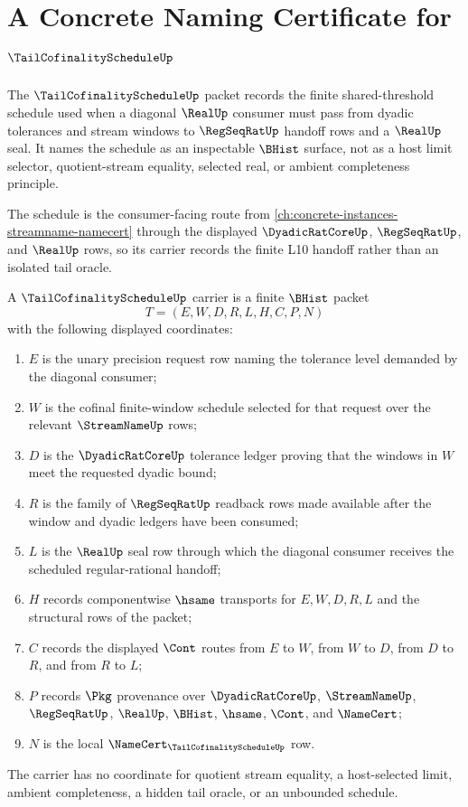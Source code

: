 \chapter{A Concrete Naming Certificate for $\TailCofinalityScheduleUp$}
\label{ch:concrete-instances-tail-cofinality-schedule-namecert}

The $\TailCofinalityScheduleUp$ packet records the finite shared-threshold schedule used when a diagonal $\RealUp$ consumer must pass from dyadic tolerances and stream windows to $\RegSeqRatUp$ handoff rows and a $\RealUp$ seal. It names the schedule as an inspectable $\BHist$ surface, not as a host limit selector, quotient-stream equality, selected real, or ambient completeness principle.

The schedule is the consumer-facing route from \autoref{ch:concrete-instances-streamname-namecert} through the displayed $\DyadicRatCoreUp$, $\RegSeqRatUp$, and $\RealUp$ rows, so its carrier records the finite L10 handoff rather than an isolated tail oracle.

\begin{definition}
\label{def:tail-cofinality-schedule-carrier}
A $\TailCofinalityScheduleUp$ carrier is a finite $\BHist$ packet
$$
T=(E,W,D,R,L,H,C,P,N)
$$
with the following displayed coordinates:
\begin{enumerate}
\item $E$ is the unary precision request row naming the tolerance level demanded by the diagonal consumer;
\item $W$ is the cofinal finite-window schedule selected for that request over the relevant $\StreamNameUp$ rows;
\item $D$ is the $\DyadicRatCoreUp$ tolerance ledger proving that the windows in $W$ meet the requested dyadic bound;
\item $R$ is the family of $\RegSeqRatUp$ readback rows made available after the window and dyadic ledgers have been consumed;
\item $L$ is the $\RealUp$ seal row through which the diagonal consumer receives the scheduled regular-rational handoff;
\item $H$ records componentwise $\hsame$ transports for $E,W,D,R,L$ and the structural rows of the packet;
\item $C$ records the displayed $\Cont$ routes from $E$ to $W$, from $W$ to $D$, from $D$ to $R$, and from $R$ to $L$;
\item $P$ records $\Pkg$ provenance over $\DyadicRatCoreUp$, $\StreamNameUp$, $\RegSeqRatUp$, $\RealUp$, $\BHist$, $\hsame$, $\Cont$, and $\NameCert$;
\item $N$ is the local $\NameCert_{\TailCofinalityScheduleUp}$ row.
\end{enumerate}
The carrier has no coordinate for quotient stream equality, a host-selected limit, ambient completeness, a hidden tail oracle, or an unbounded schedule.
\end{definition}

